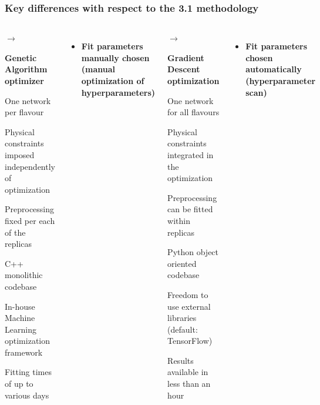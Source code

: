 \begin{frame}[t]
    \frametitle{Key differences with respect to the 3.1 methodology}
    \footnotesize
    \begin{columns}[t]
            \begin{list}{\color{darkred} $\rightarrow$}{}  
                \item {\bf Genetic Algorithm optimizer}
                \item One network per flavour
                \item Physical constraints imposed independently of optimization
                \item Preprocessing fixed per each of the replicas
                \item C++ monolithic codebase
                \item In-house Machine Learning optimization framework
                \item Fitting times of up to various days
            \end{list}
            \arrowdownunder
            \begin{itemize}
                \item[]{\bf Fit parameters manually chosen \\ (manual optimization of hyperparameters)}
            \end{itemize}
            \begin{list}{\color{darkgreen} $\rightarrow$}{}  
                \item {\bf Gradient Descent optimization}
                \item One network for all flavours
                \item Physical constraints integrated in the optimization
                \item Preprocessing can be fitted within replicas
                \item Python object oriented codebase
                \item Freedom to use external libraries (default: TensorFlow)
                \item Results available in less than an hour
            \end{list}
            \arrowdownunder
            \begin{itemize}
                \item[]{\bf Fit parameters chosen automatically (hyperparameter scan)}
            \end{itemize}
    \end{columns}
\end{frame}

